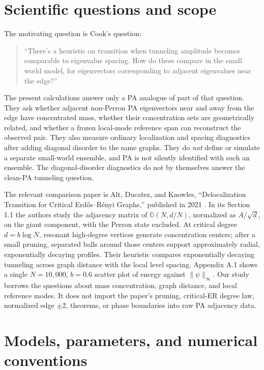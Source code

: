 \documentclass[11pt]{article}
\begin{document}
\section{Scientific questions and scope}

The motivating question is Cook's question:
\begin{quote}
``There's a heuristic on transition when tunneling amplitude becomes comparable to eigenvalue spacing. How do these compare in the small world model, for eigenvectors corresponding to adjacent eigenvalues near the edge?''
\end{quote}

The present calculations answer only a PA analogue of part of that question.  They ask whether adjacent non-Perron PA eigenvectors near and away from the edge have concentrated mass, whether their concentration sets are geometrically related, and whether a frozen local-mode reference span can reconstruct the observed pair.  They also measure ordinary localization and spacing diagnostics after adding diagonal disorder to the same graphs.  They do \emph{not} define or simulate a separate small-world ensemble, and PA is not silently identified with such an ensemble.  The diagonal-disorder diagnostics do not by themselves answer the clean-PA tunneling question.

The relevant comparison paper is Alt, Ducatez, and Knowles, ``Delocalization Transition for Critical Erd\H{o}s--R\'enyi Graphs,'' published in 2021 \cite{AltDucatezKnowles2021}.  In its Section 1.1 the authors study the adjacency matrix of \(\mathbb{G}(N,d/N)\), normalized as \(A/\sqrt d\), on the giant component, with the Perron state excluded.  At critical degree \(d=b\log N\), resonant high-degree vertices generate concentration centers; after a small pruning, separated balls around those centers support approximately radial, exponentially decaying profiles.  Their heuristic compares exponentially decaying tunneling across graph distance with the local level spacing.  Appendix A.1 shows a single \(N=10{,}000\), \(b=0.6\) scatter plot of energy against \(\lVert\psi\rVert_\infty\).  Our study borrows the questions about mass concentration, graph distance, and local reference modes.  It does not import the paper's pruning, critical-ER degree law, normalized edge \(\pm2\), theorems, or phase boundaries into raw PA adjacency data.

\section{Models, parameters, and numerical conventions}
\end{document}
